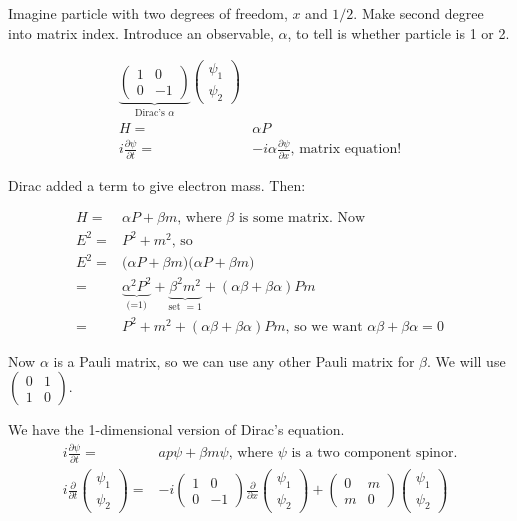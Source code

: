 \documentclass[]{article}
\begin{document}
Imagine particle with two degrees of freedom, $x$ and $1/2$. Make second degree into matrix index. Introduce an observable, $\alpha$, to tell is whether particle is 1 or 2.

\begin{align*}
\underbrace{
	\begin{pmatrix}
		1 & 0\\
		0 & -1
	\end{pmatrix}
}_\text{Dirac's $\alpha$}
\begin{pmatrix}
	\psi_1\\
	\psi_2
\end{pmatrix}\\
H =& \alpha P\\
i\frac{\partial \psi}{\partial t} =& -i \alpha \frac{\partial \psi}{\partial x} \text{, matrix equation!}
\end{align*}

Dirac added a term to give electron mass. Then:

\begin{align*}
H =& \alpha P + \beta m \text{, where $\beta$ is some matrix. Now}\\
E^2 =& P^2 + m^2 \text{, so}\\
E^2 =& \big(\alpha P + \beta m \big) \big(\alpha P + \beta m \big)\\
=& \underbrace{\alpha^2 P^2}_\text{(=1)} + \underbrace{\beta^2 m^2}_\text{set  $=1$} + (\alpha \beta + \beta \alpha) P m\\
=&  P^2 + m^2 + (\alpha \beta + \beta \alpha) P m \text{, so we want $\alpha \beta + \beta \alpha=0$}
\end{align*}

Now $\alpha$ is a Pauli matrix, so we can use any other Pauli matrix for $\beta$. We will use
$
\begin{pmatrix}
0&1\\
1&0
\end {pmatrix}
$.

We have the 1-dimensional version of Dirac's equation.
\begin{align*}
i \frac{\partial \psi}{\partial t}=& a p \psi + \beta m \psi \text{, where $\psi$ is a two component spinor.}\\
i \frac{\partial}{\partial t}\begin{pmatrix}
\psi_1\\
\psi_2
\end{pmatrix}=&-i \begin{pmatrix}
1&0\\
0&-1
\end{pmatrix} \frac{\partial}{\partial x}\begin{pmatrix}
\psi_1\\
\psi_2
\end{pmatrix} + \begin{pmatrix}
0&m\\
m&0
\end{pmatrix}\begin{pmatrix}
\psi_1\\
\psi_2
\end{pmatrix}
\end{align*}
\end{document}
